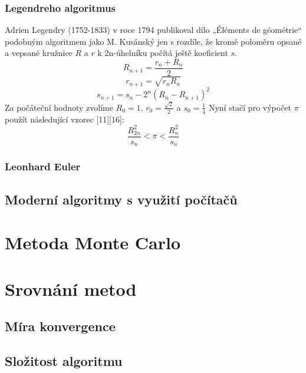 \documentclass[rocnikovka]{gzwroc} %
\begin{document}
\subsubsection{Legendreho algoritmus}
Adrien Legendry (1752-1833) v roce 1794 publikoval dílo „Éléments de géométrie“ podobným algoritmem jako M. Kusánský jen s rozdíle, že kromě poloměru opsané a vepsané kružnice $R$ a $r$ k 2n-úhelníku počítá ještě koeficient $s$.
\begin{equation}
R_{n+1}=\frac{r_n+R_n}{2}
\end{equation}
\begin{equation}
r_{n+1}=\sqrt{r_nR_n}
\end{equation}
\begin{equation}
s_{n+1}=s_n-2^n(R_n-R_{n+1})^2
\end{equation}
Za počáteční hodnoty zvolíme $R_0=1$, $r_0=\frac{\sqrt{2}}{2}$ a $s_0=\frac{1}{4}$
Nyní stačí pro výpočet $\pi$ použít následující vzorec [11][16]:
\begin{equation}
\frac{R_{2n}^2}{s_n}<\pi<\frac{R_n^2}{s_n}
\end{equation}
\subsubsection{Leonhard Euler}
\subsection{Moderní algoritmy s využití počítačů}
\section{Metoda Monte Carlo}
\section{Srovnání metod}
\subsection{Míra konvergence}
\subsection{Složitost algoritmu}
\end{document}
